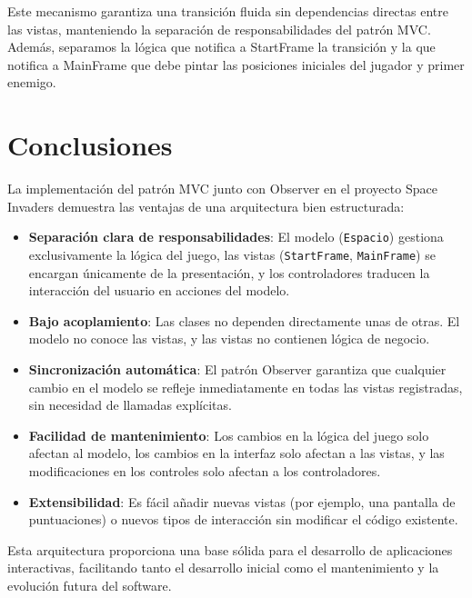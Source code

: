 \documentclass[12pt, a4paper]{article}
\begin{document}
Este mecanismo garantiza una transición fluida sin dependencias directas entre las vistas, manteniendo la separación de responsabilidades del patrón MVC.
Además, separamos la lógica que notifica a StartFrame la transición y la que notifica a MainFrame que debe pintar las posiciones iniciales del jugador y primer enemigo.

\section{Conclusiones}

La implementación del patrón MVC junto con Observer en el proyecto Space Invaders demuestra las ventajas de una arquitectura bien estructurada:

\begin{itemize}[leftmargin=2em]
    \item \textbf{Separación clara de responsabilidades}: El modelo (\texttt{Espacio}) gestiona exclusivamente la lógica del juego, las vistas (\texttt{StartFrame}, \texttt{MainFrame}) se encargan únicamente de la presentación, y los controladores traducen la interacción del usuario en acciones del modelo.
    
    \item \textbf{Bajo acoplamiento}: Las clases no dependen directamente unas de otras. El modelo no conoce las vistas, y las vistas no contienen lógica de negocio.
    
    \item \textbf{Sincronización automática}: El patrón Observer garantiza que cualquier cambio en el modelo se refleje inmediatamente en todas las vistas registradas, sin necesidad de llamadas explícitas.
    
    \item \textbf{Facilidad de mantenimiento}: Los cambios en la lógica del juego solo afectan al modelo, los cambios en la interfaz solo afectan a las vistas, y las modificaciones en los controles solo afectan a los controladores.
    
    \item \textbf{Extensibilidad}: Es fácil añadir nuevas vistas (por ejemplo, una pantalla de puntuaciones) o nuevos tipos de interacción sin modificar el código existente.
\end{itemize}

Esta arquitectura proporciona una base sólida para el desarrollo de aplicaciones interactivas, facilitando tanto el desarrollo inicial como el mantenimiento y la evolución futura del software.
\end{document}
